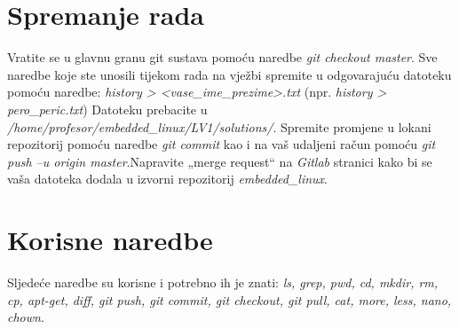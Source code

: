 \documentclass[11pt]{article}
\begin{document}
\section{Spremanje rada}
Vratite se u glavnu granu git sustava pomoću naredbe
 \textit{git checkout master}. Sve naredbe koje ste unosili tijekom rada na
 vježbi spremite u odgovarajuću datoteku pomoću naredbe:
\newline
\newline
\textit{history > <vase\_ime\_prezime>.txt} (npr.
\textit{history > pero\_peric.txt})
\newline
\newline
Datoteku prebacite u \textit{/home/profesor/embedded\_linux/LV1/solutions/}.
 Spremite promjene u lokani repozitorij pomoću naredbe \textit{git commit} kao
 i na vaš udaljeni račun pomoću \textit{git push –u origin master}.Napravite
 „merge request“ na \textit{Gitlab} stranici kako bi se vaša datoteka
 dodala u izvorni repozitorij \textit{embedded\_linux}.
 \section{Korisne naredbe}
Sljedeće naredbe su korisne i potrebno ih je znati: \textit{ls, grep, pwd, cd,
 mkdir, rm, cp, apt-get, diff, git push, git commit, git checkout, git pull,
 cat, more, less, nano, chown}.
\end{document}
